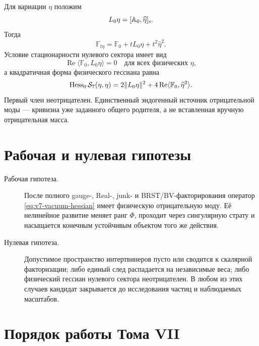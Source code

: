 Для вариации $\eta$ положим
\begin{equation}
 L_0\eta=[\mathbb A_0,\widehat\eta]_{\rm s}.
\end{equation}
Тогда
\begin{equation}
 \mathbb F_{t\eta}
 =\mathbb F_0+tL_0\eta+t^2\widehat\eta^{2}.
\end{equation}
Условие стационарности нулевого сектора имеет вид
\begin{equation}
 \operatorname{Re}\langle\mathbb F_0,L_0\eta\rangle=0
 \quad
 \text{для всех физических }\eta,
 \label{eq:v7-vacuum-stationarity}
\end{equation}
а квадратичная форма физического гессиана равна
\begin{equation}
 \operatorname{Hess}_0\mathcal S_7(\eta,\eta)
 =2\|L_0\eta\|^2
 +4\operatorname{Re}
 \langle\mathbb F_0,\widehat\eta^{2}\rangle.
 \label{eq:v7-vacuum-hessian}
\end{equation}
Первый член неотрицателен. Единственный эндогенный источник отрицательной
моды --- кривизна уже заданного общего родителя, а не вставленная вручную
отрицательная масса.

\section{Рабочая и нулевая гипотезы}

\begin{description}
 \item[Рабочая гипотеза.] После полного gauge-, Real-, junk- и
 BRST/BV-факторирования оператор \eqref{eq:v7-vacuum-hessian} имеет
 физическую отрицательную моду. Её нелинейное развитие меняет ранг $\Phi$,
 проходит через сингулярную страту и насыщается конечным устойчивым
 объектом того же действия.

 \item[Нулевая гипотеза.] Допустимое пространство интертвинеров пусто или
 сводится к скалярной факторизации; либо единый след распадается на
 независимые веса; либо физический гессиан нулевого сектора неотрицателен.
 В любом из этих случаев кандидат закрывается до исследования частиц и
 наблюдаемых масштабов.
\end{description}

\section{Порядок работы Тома VII}

